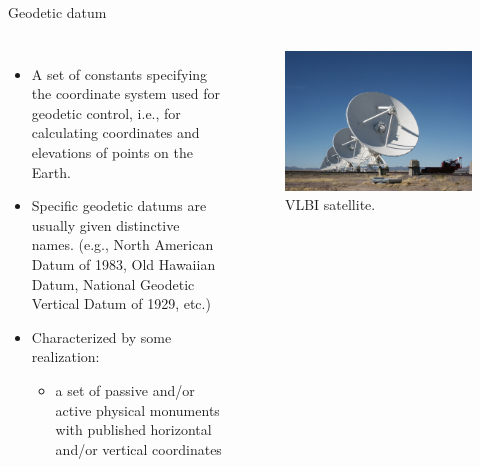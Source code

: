 \documentclass[11pt,dvipsnames,ignorenonframetext,aspectratio=169]{beamer}
\providecommand{\tightlist}{%
  \setlength{\itemsep}{0pt}\setlength{\parskip}{0pt}}
\newcommand{\bcolumns}{\begin{columns}[T, onlytextwidth]}
\newcommand{\ecolumns}{\end{columns}}
\begin{document}
\begin{frame}{Geodetic datum}
\protect\hypertarget{geodetic-datum}{}
\bcolumns
{}
\footnotesize

\begin{itemize}
\tightlist
\item
  A set of constants specifying the coordinate system used for geodetic
  control, i.e., for calculating coordinates and elevations of points on
  the Earth.
\item
  Specific geodetic datums are usually given distinctive names. (e.g.,
  North American Datum of 1983, Old Hawaiian Datum, National Geodetic
  Vertical Datum of 1929, etc.)
\item
  Characterized by some realization:

  \begin{itemize}
  \scriptsize
  \item a set of passive and/or active physical monuments with published horizontal and/or vertical coordinates
  \end{itemize}
\end{itemize}


\begin{figure}
\includegraphics[width=0.98\linewidth]{../images/vlbi_satellite} \caption{VLBI satellite.}\label{fig:vlbi-satellite}
\end{figure}

\ecolumns
\end{frame}
\end{document}
